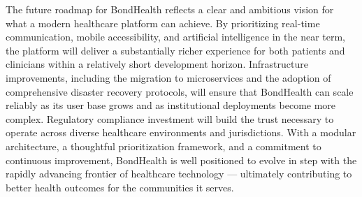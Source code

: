 \noindent The future roadmap for BondHealth reflects a clear and ambitious vision for what a modern healthcare platform can achieve. By prioritizing real-time communication, mobile accessibility, and artificial intelligence in the near term, the platform will deliver a substantially richer experience for both patients and clinicians within a relatively short development horizon. Infrastructure improvements, including the migration to microservices and the adoption of comprehensive disaster recovery protocols, will ensure that BondHealth can scale reliably as its user base grows and as institutional deployments become more complex. Regulatory compliance investment will build the trust necessary to operate across diverse healthcare environments and jurisdictions. With a modular architecture, a thoughtful prioritization framework, and a commitment to continuous improvement, BondHealth is well positioned to evolve in step with the rapidly advancing frontier of healthcare technology --- ultimately contributing to better health outcomes for the communities it serves.